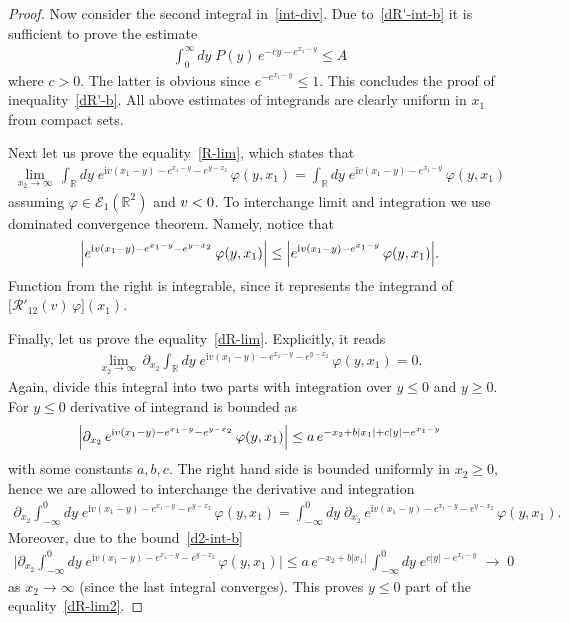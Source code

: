 \documentclass[11pt]{article}
\numberwithin{equation}{section}
\theoremstyle{plain}
\theoremstyle{definition}
\let\Im\relax
\DeclareMathOperator{\Im}{Im}
\renewcommand{\phi}{\varphi}
\renewcommand{\imath}{\mathrm{i}}
\begin{document}
\begin{proof}
	Now consider the second integral in~\eqref{int-div}. Due to~\eqref{dR'-int-b} it is sufficient to prove the estimate
	\begin{align}
		\int_0^\infty dy \; P(y) \, e^{- cy - e^{x_1 - y}} \leq A
	\end{align}
	where $c > 0$. The latter is obvious since $e^{-e^{x_1 - y}} \leq 1$. This concludes the proof of inequality~\eqref{dR'-b}. All above estimates of integrands are clearly uniform in $x_1$ from compact sets.
	
	Next let us prove the equality~\eqref{R-lim}, which states that
	\begin{align}
		\lim_{x_2 \to \infty} \, \int_{\mathbb{R}} dy \; e^{ \imath v(x_1 - y) - e^{x_1 - y} - e^{y - x_2} } \, \phi(y, x_1) = \int_{\mathbb{R}} dy \; e^{ \imath v(x_1 - y) - e^{x_1 - y}  } \, \phi(y, x_1) 
	\end{align}
	assuming $\phi \in \mathcal{E}_1(\mathbb{R}^2)$ and $\Im v <0$.
	To interchange limit and integration we use dominated convergence theorem. Namely, notice that
	\begin{align}
		\Bigl| e^{ \imath v(x_1 - y) - e^{x_1 - y} - e^{y - x_2} } \, \phi(y, x_1) \Bigr| \leq \Bigl| e^{ \imath v(x_1 - y) - e^{x_1 - y}  } \, \phi(y, x_1) \Bigr| .
	\end{align}
	Function from the right is integrable, since it represents the integrand of $\bigl[ \mathcal{R}'_{12}(v) \, \phi \bigr] (x_1)$. 
	
	Finally, let us prove the equality~\eqref{dR-lim}. Explicitly, it reads
	\begin{align} \label{dR-lim2}
		\lim_{x_2 \to \infty} \, \partial_{x_2}  \int_{\mathbb{R}} dy \; e^{ \imath v(x_1 - y) - e^{x_1 - y} - e^{y - x_2} } \, \phi(y, x_1) = 0.
	\end{align}
	Again, divide this integral into two parts with integration over $y \leq 0$ and $y \geq 0$. For $y \leq 0$ derivative of integrand is bounded as
	\begin{align} \label{d2-int-b}
			\Bigl| \partial_{x_2} \, e^{ \imath v(x_1 - y) - e^{x_1 - y} - e^{y - x_2} } \, \phi(y, x_1)  \Bigr| \leq a \, e^{- x_2 + b |x_1| + c|y| - e^{x_1 - y}} 
	\end{align}
	with some constants $a, b, c$. The right hand side is bounded uniformly in $x_2 \geq 0$, hence we are allowed to interchange the derivative and integration
	\begin{align}
		\partial_{x_2}  \int_{-\infty}^0 dy \; e^{ \imath v(x_1 - y) - e^{x_1 - y} - e^{y - x_2} } \, \phi(y, x_1) = \int_{-\infty}^0 dy \; \partial_{x_2}  \, e^{ \imath v(x_1 - y) - e^{x_1 - y} - e^{y - x_2} } \, \phi(y, x_1) .
	\end{align}
	Moreover, due to the bound~\eqref{d2-int-b}
	\begin{align}
		\biggl| \partial_{x_2}  \int_{-\infty}^0 dy \; e^{ \imath v(x_1 - y) - e^{x_1 - y} - e^{y - x_2} } \, \phi(y, x_1) \biggr| \leq a \, e^{-x_2 + b |x_1|} \, \int_{-\infty}^0 dy \; e^{  c|y| - e^{x_1 - y}} \; \to \; 0
	\end{align}
	as $x_2 \to \infty$ (since the last integral converges). This proves $y \leq 0$ part of the equality~\eqref{dR-lim2}. 
	

\end{proof}
\end{document}

